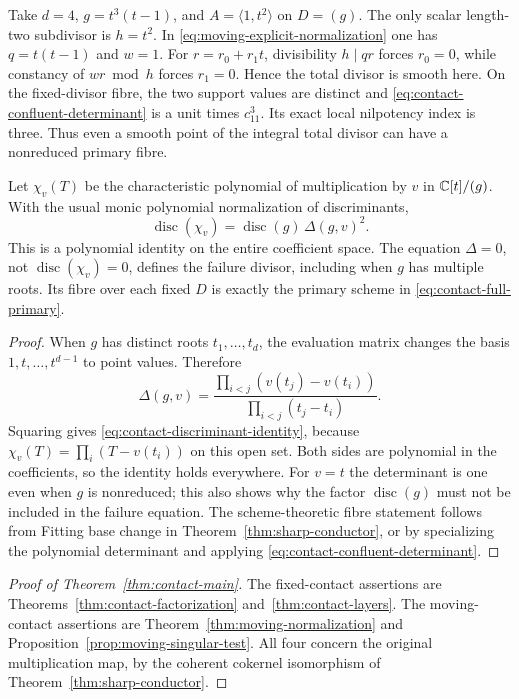 \begin{remark}
\label{rem:contact-smooth-total-triple-fibre}
Take $d=4$, $g=t^3(t-1)$, and $A=\langle1,t^2\rangle$ on
$D=(g)$. The only scalar length-two subdivisor is $h=t^2$.
In \eqref{eq:moving-explicit-normalization} one has
$q=t(t-1)$ and $w=1$. For $r=r_0+r_1t$, divisibility
$h\mid qr$ forces $r_0=0$, while constancy of $wr\bmod h$
forces $r_1=0$. Hence the total divisor is smooth here. On the
fixed-divisor fibre, the two support values are distinct and
\eqref{eq:contact-confluent-determinant} is a unit times $c_{11}^3$.
Its exact local nilpotency index is three. Thus even a smooth point
of the integral total divisor can have a nonreduced primary fibre.
\end{remark}

\begin{proposition}
\label{prop:contact-discriminant}
Let $\chi_v(T)$ be the characteristic polynomial of multiplication
by $v$ in $\mathbb C[t]/(g)$. With the usual monic polynomial
normalization of discriminants,
\begin{equation}\label{eq:contact-discriminant-identity}
 \operatorname{disc}(\chi_v)=
                     \operatorname{disc}(g)\,\Delta(g,v)^2.
\end{equation}
This is a polynomial identity on the entire coefficient space.
The equation $\Delta=0$, not $\operatorname{disc}(\chi_v)=0$,
defines the failure divisor, including when $g$ has multiple roots.
Its fibre over each fixed $D$ is exactly the primary scheme in
\eqref{eq:contact-full-primary}.
\end{proposition}
\begin{proof}
When $g$ has distinct roots $t_1,\ldots,t_d$, the evaluation
matrix changes the basis $1,t,\ldots,t^{d-1}$ to point values.
Therefore
\[
 \Delta(g,v)=\frac{\prod_{i<j}(v(t_j)-v(t_i))}
                   {\prod_{i<j}(t_j-t_i)}.
\]
Squaring gives \eqref{eq:contact-discriminant-identity}, because
$\chi_v(T)=\prod_i(T-v(t_i))$ on this open set. Both sides are
polynomial in the coefficients, so the identity holds everywhere.
For $v=t$ the determinant is one even when $g$ is nonreduced; this
also shows why the factor $\operatorname{disc}(g)$ must not be
included in the failure equation. The scheme-theoretic fibre
statement follows from Fitting base change in
Theorem~\ref{thm:sharp-conductor}, or by specializing the
polynomial determinant and applying
\eqref{eq:contact-confluent-determinant}.
\end{proof}

\begin{proof}[Proof of Theorem~\ref{thm:contact-main}]
The fixed-contact assertions are
Theorems~\ref{thm:contact-factorization} and~\ref{thm:contact-layers}.
The moving-contact assertions are
Theorem~\ref{thm:moving-normalization} and
Proposition~\ref{prop:moving-singular-test}. All four concern the
original multiplication map, by the coherent cokernel isomorphism
of Theorem~\ref{thm:sharp-conductor}.
\end{proof}
